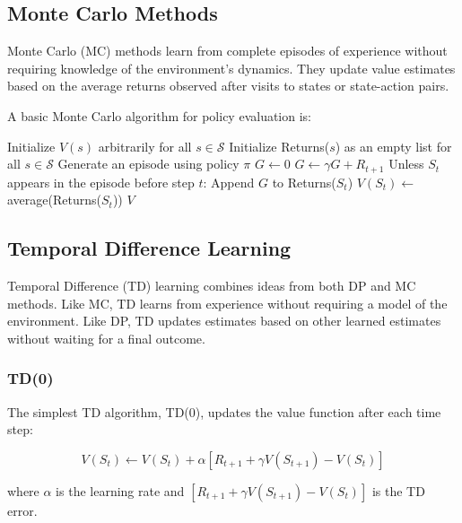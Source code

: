 \documentclass{article}
\begin{document}
\subsection{Monte Carlo Methods}

Monte Carlo (MC) methods learn from complete episodes of experience without requiring knowledge of the environment's dynamics. They update value estimates based on the average returns observed after visits to states or state-action pairs.

A basic Monte Carlo algorithm for policy evaluation is:

\begin{algorithm}
\begin{algorithmic}[1]
\STATE Initialize $V(s)$ arbitrarily for all $s \in \mathcal{S}$
\STATE Initialize Returns($s$) as an empty list for all $s \in \mathcal{S}$
\REPEAT
    \STATE Generate an episode using policy $\pi$
    \STATE $G \leftarrow 0$
        \STATE $G \leftarrow \gamma G + R_{t+1}$
        \STATE Unless $S_t$ appears in the episode before step $t$:
        \STATE Append $G$ to Returns($S_t$)
        \STATE $V(S_t) \leftarrow$ average(Returns($S_t$))
    \ENDFOR
{}
\RETURN $V$
\end{algorithmic}
\end{algorithm}

\subsection{Temporal Difference Learning}

Temporal Difference (TD) learning combines ideas from both DP and MC methods. Like MC, TD learns from experience without requiring a model of the environment. Like DP, TD updates estimates based on other learned estimates without waiting for a final outcome.

\subsubsection{TD(0)}

The simplest TD algorithm, TD(0), updates the value function after each time step:

\begin{equation}
V(S_t) \leftarrow V(S_t) + \alpha [R_{t+1} + \gamma V(S_{t+1}) - V(S_t)]
\end{equation}

where $\alpha$ is the learning rate and $[R_{t+1} + \gamma V(S_{t+1}) - V(S_t)]$ is the TD error.
\end{document}
